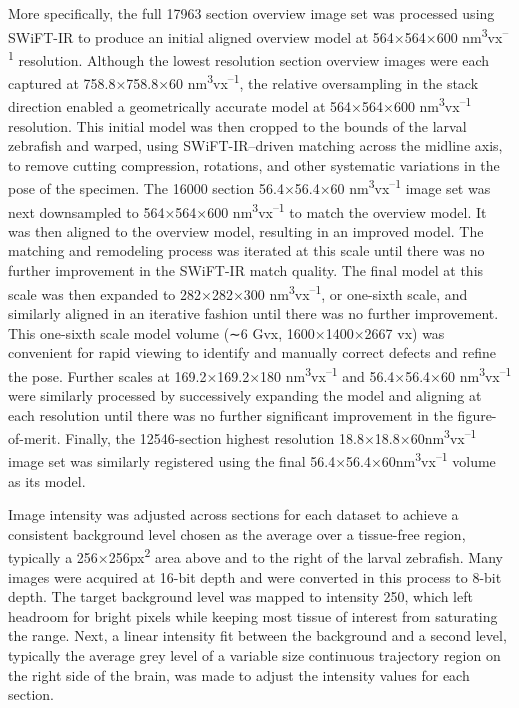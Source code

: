 \documentclass{article}
\begin{document}
More specifically, the full 17963 section overview image set was processed using SWiFT-IR to produce an initial aligned overview model at 564×564×600 nm\textsuperscript{3}vx\textsuperscript{–1} resolution. Although the lowest resolution section overview images were each captured at 758.8×758.8×60 nm\textsuperscript{3}vx\textsuperscript{–1}, the relative oversampling in the stack direction enabled a geometrically accurate model at 564×564×600 nm\textsuperscript{3}vx\textsuperscript{–1} resolution. This initial model was then cropped to the bounds of the larval zebrafish and warped, using SWiFT-IR–driven matching across the midline axis, to remove cutting compression, rotations, and other systematic variations in the pose of the specimen. The 16000 section 56.4×56.4×60 nm\textsuperscript{3}vx\textsuperscript{–1} image set was next downsampled to 564×564×600 nm\textsuperscript{3}vx\textsuperscript{–1} to match the overview model. It was then aligned to the overview model, resulting in an improved model. The matching and remodeling process was iterated at this scale until there was no further improvement in the SWiFT-IR match quality. The final model at this scale was then expanded to 282×282×300 nm\textsuperscript{3}vx\textsuperscript{–1}, or one-sixth scale, and similarly aligned in an iterative fashion until there was no further improvement. This one-sixth scale model volume (∼6 Gvx, 1600×1400×2667 vx) was convenient for rapid viewing to identify and manually correct defects and refine the pose. Further scales at 169.2×169.2×180 nm\textsuperscript{3}vx\textsuperscript{–1} and 56.4×56.4×60 nm\textsuperscript{3}vx\textsuperscript{–1} were similarly processed by successively expanding the model and aligning at each resolution until there was no further significant improvement in the figure-of-merit. Finally, the 12546-section highest resolution 18.8×18.8×60nm\textsuperscript{3}vx\textsuperscript{–1} image set was similarly registered using the final 56.4×56.4×60nm\textsuperscript{3}vx\textsuperscript{–1} volume as its model.

Image intensity was adjusted across sections for each dataset to achieve a consistent background level chosen as the average over a tissue-free region, typically a 256×256px\textsuperscript{2} area above and to the right of the larval zebrafish. Many images were acquired at 16-bit depth and were converted in this process to 8-bit depth. The target background level was mapped to intensity 250, which left headroom for bright pixels while keeping most tissue of interest from saturating the range. Next, a linear intensity fit between the background and a second level, typically the average grey level of a variable size continuous trajectory region on the right side of the brain, was made to adjust the intensity values for each section.
\end{document}

